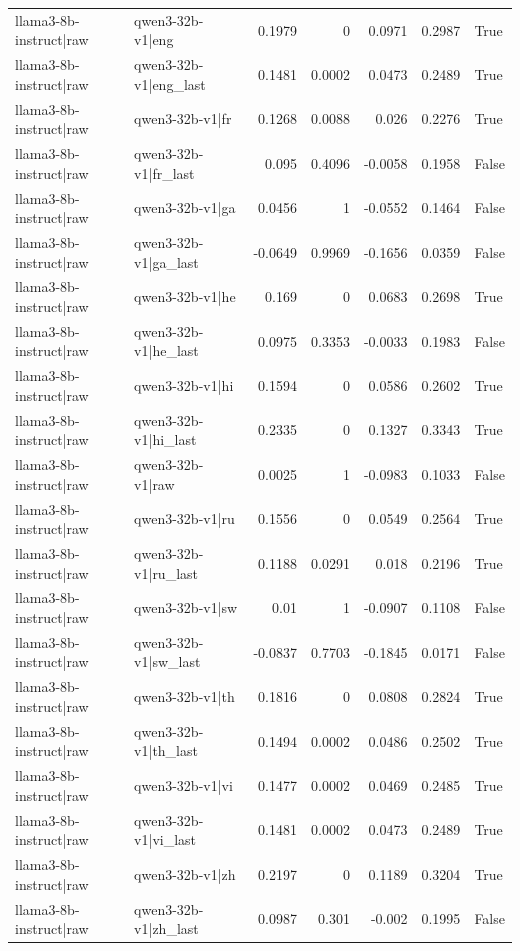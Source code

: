 \begin{table}
\begin{tabular}{l l r r r r l}
llama3-8b-instruct|raw & qwen3-32b-v1|eng & 0.1979 & 0 & 0.0971 & 0.2987 & True \\
llama3-8b-instruct|raw & qwen3-32b-v1|eng_last & 0.1481 & 0.0002 & 0.0473 & 0.2489 & True \\
llama3-8b-instruct|raw & qwen3-32b-v1|fr & 0.1268 & 0.0088 & 0.026 & 0.2276 & True \\
llama3-8b-instruct|raw & qwen3-32b-v1|fr_last & 0.095 & 0.4096 & -0.0058 & 0.1958 & False \\
llama3-8b-instruct|raw & qwen3-32b-v1|ga & 0.0456 & 1 & -0.0552 & 0.1464 & False \\
llama3-8b-instruct|raw & qwen3-32b-v1|ga_last & -0.0649 & 0.9969 & -0.1656 & 0.0359 & False \\
llama3-8b-instruct|raw & qwen3-32b-v1|he & 0.169 & 0 & 0.0683 & 0.2698 & True \\
llama3-8b-instruct|raw & qwen3-32b-v1|he_last & 0.0975 & 0.3353 & -0.0033 & 0.1983 & False \\
llama3-8b-instruct|raw & qwen3-32b-v1|hi & 0.1594 & 0 & 0.0586 & 0.2602 & True \\
llama3-8b-instruct|raw & qwen3-32b-v1|hi_last & 0.2335 & 0 & 0.1327 & 0.3343 & True \\
llama3-8b-instruct|raw & qwen3-32b-v1|raw & 0.0025 & 1 & -0.0983 & 0.1033 & False \\
llama3-8b-instruct|raw & qwen3-32b-v1|ru & 0.1556 & 0 & 0.0549 & 0.2564 & True \\
llama3-8b-instruct|raw & qwen3-32b-v1|ru_last & 0.1188 & 0.0291 & 0.018 & 0.2196 & True \\
llama3-8b-instruct|raw & qwen3-32b-v1|sw & 0.01 & 1 & -0.0907 & 0.1108 & False \\
llama3-8b-instruct|raw & qwen3-32b-v1|sw_last & -0.0837 & 0.7703 & -0.1845 & 0.0171 & False \\
llama3-8b-instruct|raw & qwen3-32b-v1|th & 0.1816 & 0 & 0.0808 & 0.2824 & True \\
llama3-8b-instruct|raw & qwen3-32b-v1|th_last & 0.1494 & 0.0002 & 0.0486 & 0.2502 & True \\
llama3-8b-instruct|raw & qwen3-32b-v1|vi & 0.1477 & 0.0002 & 0.0469 & 0.2485 & True \\
llama3-8b-instruct|raw & qwen3-32b-v1|vi_last & 0.1481 & 0.0002 & 0.0473 & 0.2489 & True \\
llama3-8b-instruct|raw & qwen3-32b-v1|zh & 0.2197 & 0 & 0.1189 & 0.3204 & True \\
llama3-8b-instruct|raw & qwen3-32b-v1|zh_last & 0.0987 & 0.301 & -0.002 & 0.1995 & False \\

\end{tabular}
\end{table}

